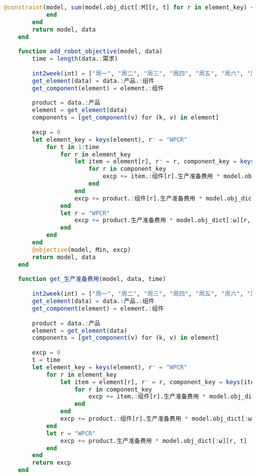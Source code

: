\begin{appendices}
\begin{lstlisting}[language=julia]
                @constraint(model, sum(model.obj_dict[:M][r, t] for r in element_key) <= data.:生产总工时限制[int2week(t)])
            end
        end
        return model, data
    end
    
    function add_robot_objective(model, data)
        time = length(data.:需求)
    
        int2week(int) = ["周一", "周二", "周三", "周四", "周五", "周六", "周日"][int]
        get_element(data) = data.:产品.:组件
        get_component(element) = element.:组件
    
        product = data.:产品
        element = get_element(data)
        components = [get_component(v) for (k, v) in element]
    
        excp = 0
        let element_key = keys(element), r⁻ = "WPCR"
            for t in 1:time
                for r in element_key
                    let item = element[r], r⁻ = r, component_key = keys(item.:组件)
                        for r in component_key
                            excp += item.:组件[r].生产准备费用 * model.obj_dict[:ω][r, t] + item.:组件[r].单件库存费用 * model.obj_dict[:y][r, t]
                        end
                    end
                    excp += product.:组件[r].生产准备费用 * model.obj_dict[:ω][r, t] + product.:组件[r].单件库存费用 * model.obj_dict[:y][r, t]
                end
                let r = "WPCR"
                    excp += product.生产准备费用 * model.obj_dict[:ω][r, t] + product.单件库存费用 * model.obj_dict[:y][r, t]
                end
            end
        end
        @objective(model, Min, excp)
        return model, data
    end
    
    function get_生产准备费用(model, data, time)
    
        int2week(int) = ["周一", "周二", "周三", "周四", "周五", "周六", "周日"][int]
        get_element(data) = data.:产品.:组件
        get_component(element) = element.:组件
    
        product = data.:产品
        element = get_element(data)
        components = [get_component(v) for (k, v) in element]
    
        excp = 0
        t = time
        let element_key = keys(element), r⁻ = "WPCR"
            for r in element_key
                let item = element[r], r⁻ = r, component_key = keys(item.:组件)
                    for r in component_key
                        excp += item.:组件[r].生产准备费用 * model.obj_dict[:ω][r, t]
                    end
                end
                excp += product.:组件[r].生产准备费用 * model.obj_dict[:ω][r, t]
            end
            let r = "WPCR"
                excp += product.生产准备费用 * model.obj_dict[:ω][r, t]
            end
        end
        return excp
    end
    

\end{lstlisting}
\end{appendices}
